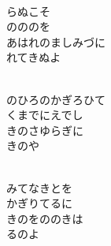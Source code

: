 \documentclass[10pt,b5j]{tarticle} %
\begin{document}
\vspace{1.5em} %
\newcommand{\linespace}{0.5em} %
\newcommand{\blocksize}{0.5\hsize} %
\newcommand{\itemmargin}{3em} %
\begin{enumerate} %
    \setlength{\itemindent}{\itemmargin} %
    \begin{minipage}[c]{\blocksize}
    
        \vspace{\linespace}
        \item~\\
        らぬこそ\\
        のののを\\
        あはれのましみづに\\
        れてきぬよ
        
    \end{minipage}
    \begin{minipage}[c]{\blocksize}
        
        \vspace{\linespace}
        \item~\\
        のひろのかぎろひて\\
        くまでにえでし\\
        きのさゆらぎに\\
        きのや
        
    \end{minipage}
    \begin{minipage}[c]{\blocksize}
        
        \vspace{\linespace}
        \item~\\
        みてなきとを\\
        かぎりてるに\\
        きのをののきは\\
        るのよ
        

\end{minipage}
\end{enumerate}
\end{document}
